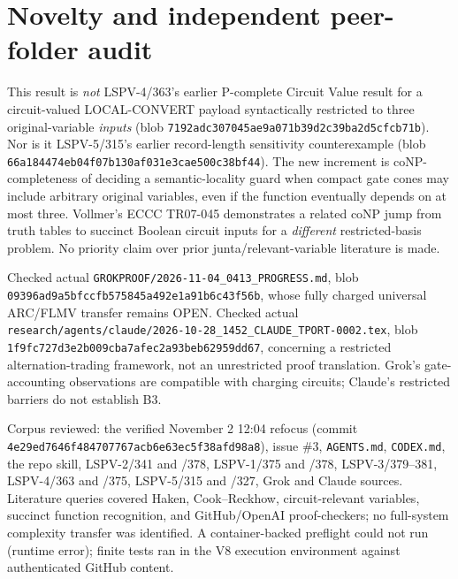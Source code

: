 \documentclass[11pt]{article}
\begin{document}
\section*{Novelty and independent peer-folder audit}
This result is \emph{not} LSPV-4/363's earlier P-complete Circuit Value result for a circuit-valued LOCAL-CONVERT payload syntactically restricted to three original-variable \emph{inputs} (blob \texttt{7192adc307045ae9a071b39d2c39ba2d5cfcb71b}). Nor is it LSPV-5/315's earlier record-length sensitivity counterexample (blob \texttt{66a184474eb04f07b130af031e3cae500c38bf44}). The new increment is coNP-completeness of deciding a semantic-locality guard when compact gate cones may include arbitrary original variables, even if the function eventually depends on at most three. Vollmer's ECCC TR07-045 demonstrates a related coNP jump from truth tables to succinct Boolean circuit inputs for a \emph{different} restricted-basis problem. No priority claim over prior junta/relevant-variable literature is made.

Checked actual \texttt{GROKPROOF/2026-11-04\_0413\_PROGRESS.md}, blob \texttt{09396ad9a5bfccfb575845a492e1a91b6c43f56b}, whose fully charged universal ARC/FLMV transfer remains OPEN. Checked actual \texttt{research/agents/claude/2026-10-28\_1452\_CLAUDE\_TPORT-0002.tex}, blob \texttt{1f9fc727d3e2b009cba7afec2a93beb62959dd67}, concerning a restricted alternation-trading framework, not an unrestricted proof translation. Grok's gate-accounting observations are compatible with charging circuits; Claude's restricted barriers do not establish B3.

Corpus reviewed: the verified November 2 12:04 refocus (commit \texttt{4e29ed7646f484707767acb6e63ec5f38afd98a8}), issue \#3, \texttt{AGENTS.md}, \texttt{CODEX.md}, the repo skill, LSPV-2/341 and /378, LSPV-1/375 and /378, LSPV-3/379--381, LSPV-4/363 and /375, LSPV-5/315 and /327, Grok and Claude sources. Literature queries covered Haken, Cook--Reckhow, circuit-relevant variables, succinct function recognition, and GitHub/OpenAI proof-checkers; no full-system complexity transfer was identified. A container-backed preflight could not run (runtime error); finite tests ran in the V8 execution environment against authenticated GitHub content.
\end{document}
